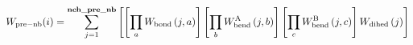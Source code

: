 \documentclass[12pt]{article}
\begin{document}
\begin{displaymath}
W_{\rm pre-nb}(i) =
\sum_{j=1}^{\bf nch\_pre\_nb}
\left[
{
\left[\prod_{a} W_{\rm bond}\left(j,a\right)\right]
\left[\prod_{b} W_{\rm bend}^{\rm A}\left(j,b\right)\right]
\left[\prod_{c} W_{\rm bend}^{\rm B}\left(j,c\right)\right]
W_{\rm dihed}\left(j\right)
}
\right]
\end{displaymath}
\end{document}

